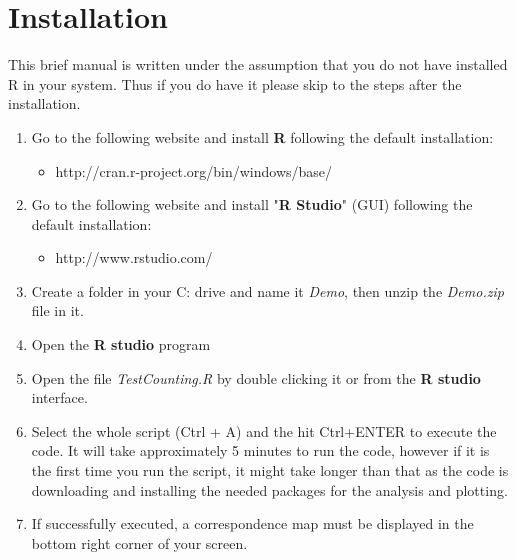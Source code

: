 \documentclass[nohyper,a4paper]{my_MindShare}
\begin{document}
\section{Installation}

This brief manual is written under the assumption that you do not have installed R in your system. Thus if you do have it please skip to the steps after the installation.

\begin{enumerate}
	\item Go to the following website and install \textbf{R} following the default installation:
	
	\begin{itemize}
		\item http://cran.r-project.org/bin/windows/base/
	\end{itemize}
	
	\item Go to the following website and install "\textbf{R Studio}" (GUI) following the default installation:
	
	\begin{itemize}
		\item http://www.rstudio.com/
	\end{itemize}
	
	\item Create a folder in your C: drive and name it \emph{Demo}, then unzip the \emph{Demo.zip} file in it.
	\item Open the \textbf{R studio}  program
	\item Open the file \emph{TestCounting.R} by double clicking it or from the \textbf{R studio} interface.
	\item Select the whole script (Ctrl + A) and the hit Ctrl+ENTER to execute the code. It will take approximately 5 minutes to run the code, however if it is the first time you run the script, it might take longer than that as the code is downloading and installing the needed packages for the analysis and plotting.
	\item	If successfully executed, a correspondence map must be displayed in the bottom right corner of your screen.
\end{enumerate}
\end{document}
